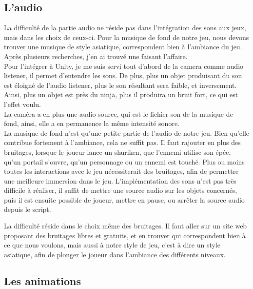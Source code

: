 \documentclass[12pt]{article}
\begin{document}
\subsection{L'audio}

La difficulté de la partie audio ne réside pas dans l'intégration des sons aux jeux, mais dans les choix de ceux-ci. Pour la musique de fond de notre jeu, nous devons trouver une musique de style asiatique, correspondent bien à l'ambiance du jeu. Après plusieurs recherches, j'en ai trouvé une faisant l'affaire.\\
Pour l'intégrer à Unity, je me suis servi tout d'abord de la camera comme audio listener, il permet d'entendre les sons. De plus, plus un objet produisant du son est éloigné de l'audio listener, plus le son résultant sera faible, et inversement. Ainsi, plus un objet est près du ninja, plus il produira un bruit fort, ce qui est l'effet voulu.\\
La caméra a en plus une audio source, qui est le fichier son de la musique de fond, ainsi, elle a en permanence la même intensité sonore.\\

La musique de fond n'est qu'une petite partie de l'audio de notre jeu. Bien qu'elle contribue fortement  à l'ambiance, cela ne suffit pas. Il faut rajouter en plus des bruitages, lorsque le joueur lance un shuriken, que l'ennemi utilise son épée, qu'un portail s'ouvre, qu'un personnage ou un ennemi est touché. Plus ou moins toutes les interactions avec le jeu nécessiterait des bruitages, afin de permettre une meilleure immersion dans le jeu. L'implémentation des sons n'est pas très difficile à réaliser, il suffit de mettre une source audio sur les objets concernés, puis il est ensuite possible de joueur, mettre en pause, ou arrêter la source audio depuis le script.

\newpage

La difficulté réside dans le choix même des bruitages. Il faut aller sur un site web proposant des bruitages libres et gratuits, et en trouver qui correspondent bien à ce que nous voulons, mais aussi à notre style de jeu, c'est à dire un style asiatique, afin de plonger le joueur dans l'ambiance des différents niveaux.

\subsection{Les animations}
\end{document}
